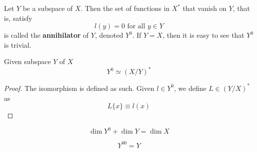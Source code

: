   \begin{definition}[Annihilator]
    Let $Y$ be a subspace of $X$. Then the set of functions in $X^*$ that vanish on $Y$, that is, satisfy
    \begin{equation}
      l(y) = 0 \text{ for all } y \in Y
    \end{equation}
    is called the \textbf{annihilator} of $Y$, denoted $Y^0$. If $Y = X$, then it is easy to see that $Y^0$ is trivial. 
  \end{definition}

  \begin{theorem}
    Given subspace $Y$ of $X$ 
    \begin{equation}
      Y^0 \simeq (X / Y)^\ast
    \end{equation}
  \end{theorem}
  \begin{proof}
    The isomorphism is defined as such. Given $l \in Y^0$, we define $L \in (Y/X)^\ast$ as 
    \begin{equation}
      L\{x\} \equiv l(x)
    \end{equation}
  \end{proof}

  \begin{corollary}
    \begin{equation}
      \dim Y^0 + \dim Y = \dim X
    \end{equation}
  \end{corollary}

  \begin{corollary}
    \begin{equation}
      Y^{0 0} = Y
    \end{equation}
  \end{corollary}

